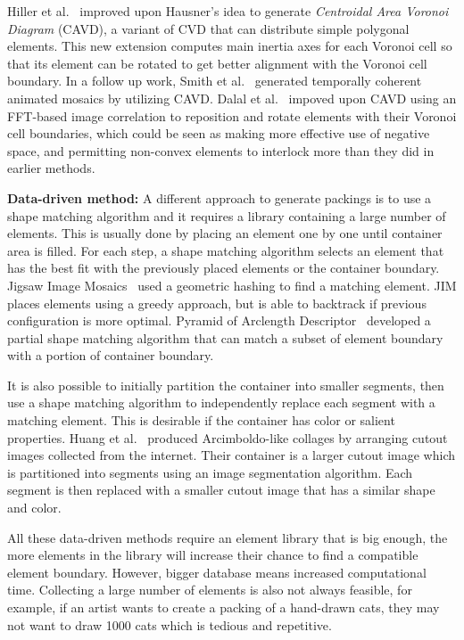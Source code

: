 Hiller et al.~\cite{Hiller2003} improved upon Hausner's idea to generate \textit{Centroidal Area Voronoi Diagram} (CAVD),
a variant of CVD that can distribute simple polygonal elements.
This new extension computes main inertia axes for each Voronoi cell so that 
its element can be rotated to get better alignment with the Voronoi cell boundary.
In a follow up work, Smith et al.~\cite{Smith2005} generated temporally coherent animated mosaics by utilizing CAVD.
Dalal et al.~\cite{Dalal2006} impoved upon CAVD using an FFT-based image correlation to reposition
and rotate elements with their Voronoi cell boundaries, which could be seen as making more effective use of negative
space, and permitting non-convex elements to interlock more than they did in
earlier methods.

\textbf{Data-driven method:} 
A different approach to generate packings is to use a shape matching algorithm
and it requires a library containing a large number of elements.
This is usually done by placing an element one by one until container area is filled.
For each step, a shape matching algorithm selects an 
element that has the best fit with the previously placed elements or the container boundary.
Jigsaw Image Mosaics~\cite{Kim2002} used a geometric hashing to find
a matching element. JIM places elements using a greedy approach, but is able to backtrack 
if previous configuration is more optimal.
Pyramid of Arclength Descriptor~\cite{Kwan2016} developed
a partial shape matching algorithm that can match a subset of element boundary with a portion
of container boundary.

It is also possible to initially partition the container into smaller segments,
then use a shape matching algorithm to independently replace each segment with a matching element.
This is desirable if the container has color or salient properties.
Huang et al.~\cite{Huang2011} produced Arcimboldo-like collages
by arranging cutout images collected from the internet.
Their container is a larger cutout image which is partitioned into segments
using an image segmentation algorithm.
Each segment is then replaced with a smaller cutout image that has a similar shape and color.

All these data-driven methods require an element library that is big enough,
the more elements in the library will increase their chance to find a compatible element boundary.
However, bigger database means increased computational time.
Collecting a large number of elements is also not always feasible,
for example, if an artist wants to create a packing of a hand-drawn cats,
they may not want to draw 1000 cats which is tedious and repetitive.

